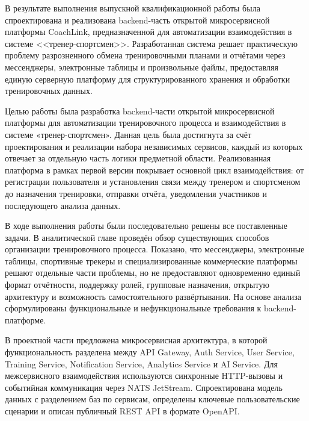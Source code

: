 \conclusion

В результате выполнения выпускной квалификационной работы была спроектирована и реализована backend-часть открытой микросервисной платформы CoachLink, предназначенной для автоматизации взаимодействия в системе <<тренер-спортсмен>>. Разработанная система решает практическую проблему разрозненного обмена тренировочными планами и отчётами через мессенджеры, электронные таблицы и произвольные файлы, предоставляя единую серверную платформу для структурированного хранения и обработки тренировочных данных.

Целью работы была разработка backend-части открытой микросервисной платформы для автоматизации тренировочного процесса и взаимодействия в системе «тренер-спортсмен». Данная цель была достигнута за счёт проектирования и реализации набора независимых сервисов, каждый из которых отвечает за отдельную часть логики предметной области. Реализованная платформа в рамках первой версии покрывает основной цикл взаимодействия: от регистрации пользователя и установления связи между тренером и спортсменом до назначения тренировки, отправки отчёта, уведомления участников и последующего анализа данных.

В ходе выполнения работы были последовательно решены все поставленные задачи. В аналитической главе проведён обзор существующих способов организации тренировочного процесса. Показано, что мессенджеры, электронные таблицы, спортивные трекеры и специализированные коммерческие платформы решают отдельные части проблемы, но не предоставляют одновременно единый формат отчётности, поддержку ролей, групповые назначения, открытую архитектуру и возможность самостоятельного развёртывания. На основе анализа сформулированы функциональные и нефункциональные требования к backend-платформе.

В проектной части предложена микросервисная архитектура, в которой функциональность разделена между API Gateway, Auth Service, User Service, Training Service, Notification Service, Analytics Service и AI Service. Для межсервисного взаимодействия используются синхронные HTTP-вызовы и событийная коммуникация через NATS JetStream. Спроектирована модель данных с разделением баз по сервисам, определены ключевые пользовательские сценарии и описан публичный REST API в формате OpenAPI.

